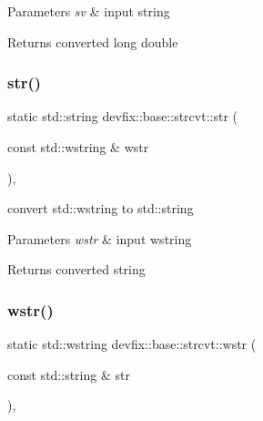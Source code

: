 \begin{DoxyParams}{Parameters}
{\em sv} & input string \\
\hline
\end{DoxyParams}
\begin{DoxyReturn}{Returns}
converted long double 
\end{DoxyReturn}
\mbox{\label{structdevfix_1_1base_1_1strcvt_a469b02dcc803d1b740643d6809660851}} 
\subsubsection{\texorpdfstring{str()}{str()}}
{\footnotesize\ttfamily static std\+::string devfix\+::base\+::strcvt\+::str (\begin{DoxyParamCaption}\item[{const std\+::wstring \&}]{wstr }\end{DoxyParamCaption})\hspace{0.3cm}{\ttfamily [inline]}, {\ttfamily [static]}}



convert std\+::wstring to std\+::string 


\begin{DoxyParams}{Parameters}
{\em wstr} & input wstring \\
\hline
\end{DoxyParams}
\begin{DoxyReturn}{Returns}
converted string 
\end{DoxyReturn}
\mbox{\label{structdevfix_1_1base_1_1strcvt_a968c3adb34ac1ab9e687280ddc0742ff}} 
\subsubsection{\texorpdfstring{wstr()}{wstr()}}
{\footnotesize\ttfamily static std\+::wstring devfix\+::base\+::strcvt\+::wstr (\begin{DoxyParamCaption}\item[{const std\+::string \&}]{str }\end{DoxyParamCaption})\hspace{0.3cm}{\ttfamily [inline]}, {\ttfamily [static]}}



